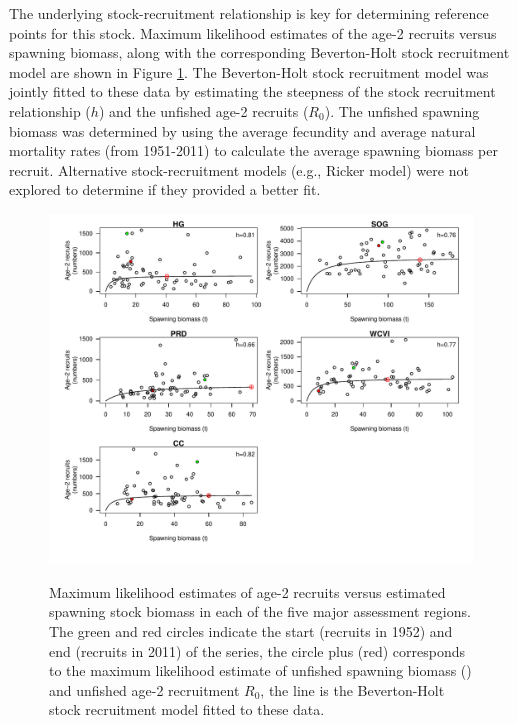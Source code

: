 The underlying stock-recruitment relationship is key for determining reference points for this stock.  Maximum likelihood estimates of the age-2 recruits versus spawning biomass, along with the corresponding Beverton-Holt stock recruitment model are shown in Figure \ref{PARTII:Results:FigStockRecruit}.  The Beverton-Holt stock recruitment model was jointly fitted to these data by estimating the steepness of the stock recruitment relationship ($h$) and the unfished age-2 recruits ($R_0$).  The unfished spawning biomass was determined by using the average fecundity and average natural mortality rates (from 1951-2011) to calculate the average spawning biomass per recruit. Alternative stock-recruitment models (e.g., Ricker model) were not explored to determine if they provided a better fit.



\begin{figure}[!tbp]
	\includegraphics[width=\textwidth]{../FIGS/qPriorFigs/iscam_fig_stockrecruit.pdf}\\
	\caption{Maximum likelihood estimates of age-2 recruits versus estimated spawning stock biomass in each of the five major assessment regions.  The green and red circles indicate the start (recruits in 1952) and end (recruits in 2011) of the series, the circle plus (red) corresponds to the maximum likelihood estimate of unfished spawning biomass (\bo) and unfished age-2 recruitment $R_0$, the line is the Beverton-Holt stock recruitment model fitted to these data. }\label{PARTII:Results:FigStockRecruit}
\end{figure}

